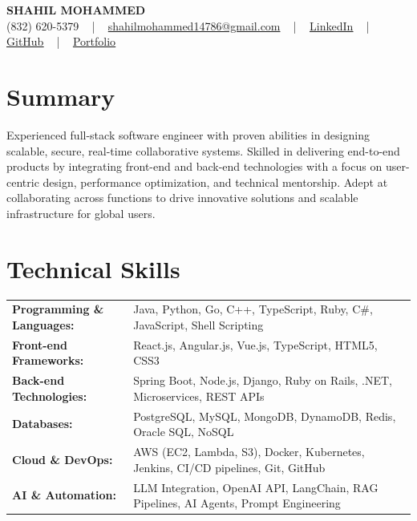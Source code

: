 \documentclass[letterpaper,11pt]{article}
\begin{document}
\begin{center}
    {\fontsize{14pt}{12pt}\selectfont \textbf{\MakeUppercase{Shahil Mohammed}}}\\ \vspace{2pt}
    \fontsize{10pt}{12pt}\selectfont (832) 620-5379 ~ | ~ \href{mailto:shahilmohammed14786@gmail.com}{shahilmohammed14786@gmail.com} ~ | ~  
    \href{https://www.linkedin.com/in/shahil-mohammed-9652931a1/}{\color{blue}\underline{LinkedIn}}  ~ | ~ 
    \href{https://github.com/freakbeast14}{\color{blue}\underline{GitHub}} ~ | ~ 
    \href{https://shahil-mohammed.netlify.app/}{\color{blue}\underline{Portfolio}}
    \vspace{-8pt}
\end{center}

\section{Summary}
\fontsize{9pt}{10pt}\selectfont
Experienced full-stack software engineer with proven abilities in designing scalable, secure, real-time collaborative systems. Skilled in delivering end-to-end products by integrating front-end and back-end technologies with a focus on user-centric design, performance optimization, and technical mentorship. Adept at collaborating across functions to drive innovative solutions and scalable infrastructure for global users.
 \vspace{-5pt}
 
\section{Technical Skills}
        \vspace{-14pt}
        \begin{table}[h]
            \fontsize{9pt}{10pt}\selectfont
            \begin{tabular}{p{0.3\linewidth} p{0.7\linewidth}}
                \textbf{Programming \& Languages:} & Java, Python, Go, C++, TypeScript, Ruby, C\#, JavaScript, Shell Scripting \\
                \textbf{Front-end Frameworks:} & React.js, Angular.js, Vue.js, TypeScript, HTML5, CSS3 \\
                \textbf{Back-end Technologies:} & Spring Boot, Node.js, Django, Ruby on Rails, .NET, Microservices, REST APIs \\
                \textbf{Databases:} & PostgreSQL, MySQL, MongoDB, DynamoDB, Redis, Oracle SQL, NoSQL \\
                \textbf{Cloud \& DevOps:} & AWS (EC2, Lambda, S3), Docker, Kubernetes, Jenkins, CI/CD pipelines, Git, GitHub \\
                \textbf{AI \& Automation:} & LLM Integration, OpenAI API, LangChain, RAG Pipelines, AI Agents, Prompt Engineering \\
            \end{tabular}
        \end{table}
 \vspace{-15pt}
 
\end{document}
